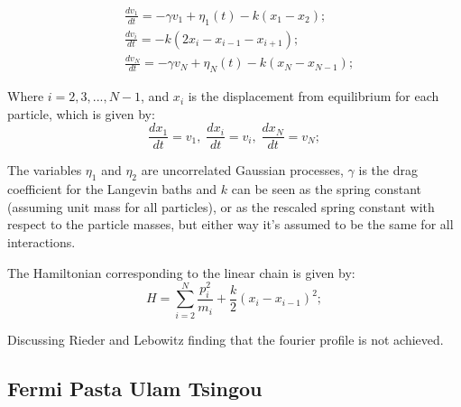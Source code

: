 \begin{equation}\label{eq:1}
\boxed{
	\begin{aligned}
	&\frac{d v_1}{dt} = -\gamma v_1 + \eta_1(t) -k\left(x_1 - x_2\right);\\
	&\frac{d v_i}{dt} = -k\left(2x_i - x_{i-1} - x_{i+1}\right);\\
	&\frac{d v_N}{dt} = -\gamma v_N + \eta_N(t) -k\left(x_N - x_{N-1}\right);
	\end{aligned}
}
\end{equation}

Where $i=2,3,...,N-1$, and $x_i$ is the displacement from equilibrium for each particle, which is given by:
$$\frac{d x_1}{dt} = v_1,\; \frac{d x_i}{dt} = v_i,\; \frac{d x_N}{dt} = v_N;$$

The variables $\eta_1$ and $\eta_2$ are uncorrelated Gaussian processes, $\gamma$ is the drag coefficient for the Langevin baths and $k$ can be seen as the spring constant (assuming unit mass for all particles), or as the rescaled spring constant with respect to the particle masses, but either way it's assumed to be the same for all interactions.

The Hamiltonian corresponding to the linear chain is given by:
$$H = \sum_{i=2}^{N} \frac{p_i^2}{m_i} + \frac{k}{2}(x_i-x_{i-1})^2;$$
%



Discussing Rieder and Lebowitz finding that the fourier profile is not achieved.

\subsection{Fermi Pasta Ulam Tsingou}

